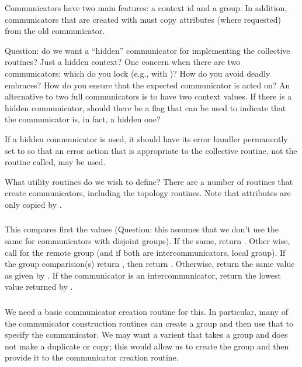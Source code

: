\documentclass{article}
\begin{document}
Communicators have two main features: a context id and a group.  In
addition, communicators that are created with  must
copy attributes (where requested) from the old communicator.

Question: do we want a ``hidden'' communicator for implementing the
collective routines?  Just a hidden context?  One concern when there
are two communicators: which do you lock (e.g., with
)?  How do you avoid deadly embraces?  How do
you 
ensure that the expected communicator is acted on?  An alternative to two full
communicators is to have two context values.  If there is a hidden
communicator, should there be a flag that can be used to indicate that the
communicator is, in fact, a hidden one?

If a hidden communicator is used, it should have its error handler permanently
set to  so that an error action that is
appropriate to 
the collective routine, not the routine called, may be used.

What utility routines do we wish to define?  There are a number of
routines that create communicators, including the topology routines.
Note that attributes are only copied by .

\subsubsection{}
This compares first the  values (Question:
this assumes that 
we don't use the same  for communicators
with disjoint 
groups).  If the same, return .  Other wise, call
 for the remote group (and if both are
intercommunicators, local group).  If the group comparision(s) return
, then return .  Otherwise, return
the same value as given by .  If the
communicator is an intercommunicator, return the lowest value returned
by .


\subsubsection{}
We need a basic communicator creation routine for this.  In
particular, many of the communicator construction routines can create
a group and then use that to specify the communicator.  We may want a
varient that takes a group and does not make a duplicate or copy; this
would allow us to create the group and then provide it to the
communicator creation routine.
\end{document}
